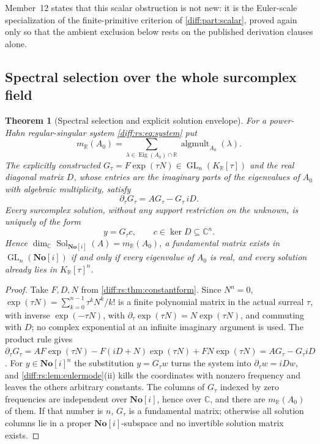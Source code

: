 \documentclass[11pt,letterpaper]{article}
\numberwithin{equation}{section}
\newtheorem{theorem}{Theorem}[section]
\theoremstyle{definition}
\theoremstyle{remark}
\newcommand{\SC}{\mathbf{No}[i]}
\newcommand{\R}{\mathbb R}
\newcommand{\C}{\mathbb C}
\newcommand{\der}{\partial}
\newcommand{\GL}{\operatorname{GL}}
\newcommand{\Ker}{\operatorname{ker}}
\newcommand{\derT}{\der_{\tau}}
\newcommand{\KR}{K_{\R}}
\newcommand{\Eig}{\operatorname{Eig}}
\newcommand{\Sol}{\operatorname{Sol}}
\begin{document}
Member~12 states that this scalar obstruction is not new: it is the
Euler-scale specialization of the finite-primitive criterion of
\cref{diff:part:scalar}, proved again only so that the ambient exclusion below
rests on the published derivation clauses alone.

\subsection{Spectral selection over the whole surcomplex field}
\label{diff:rs:sub:selection}

\begin{theorem}[Spectral selection and explicit solution envelope]
\label{diff:rs:thm:selection}
For a power-Hahn regular-singular system \cref{diff:rs:eq:system} put
\[
 m_{\R}(A_{0})=\sum_{\lambda\in\Eig(A_{0})\cap\R}\operatorname{algmult}_{A_{0}}(\lambda).
\]
The explicitly constructed $G_{\tau}=F\exp(\tau N)\in\GL_{n}(\KR[\tau])$ and
the real diagonal matrix $D$, whose entries are the imaginary parts of the
eigenvalues of $A_{0}$ with algebraic multiplicity, satisfy
\begin{equation}\label{diff:rs:eq:Gtau}
 \derT G_{\tau}=AG_{\tau}-G_{\tau}\,iD .
\end{equation}
Every surcomplex solution, without any support restriction on the unknown, is
uniquely of the form
\begin{equation}\label{diff:rs:eq:allsol}
 y=G_{\tau}c,\qquad c\in\Ker D\subseteq\C^{n}.
\end{equation}
Hence $\dim_{\C}\Sol_{\SC}(A)=m_{\R}(A_{0})$, a fundamental matrix exists in
$\GL_{n}(\SC)$ if and only if every eigenvalue of $A_{0}$ is real, and every
solution already lies in $\KR[\tau]^{n}$.
\end{theorem}
\begin{proof}
Take $F,D,N$ from \cref{diff:rs:thm:constantform}. Since $N^{n}=0$,
$\exp(\tau N)=\sum_{k=0}^{n-1}\tau^{k}N^{k}/k!$ is a finite polynomial matrix
in the actual surreal $\tau$, with inverse $\exp(-\tau N)$, with
$\derT\exp(\tau N)=N\exp(\tau N)$, and commuting with $D$; no complex exponential
at an infinite imaginary argument is used. The product rule gives
$\derT G_{\tau}=AF\exp(\tau N)-F(iD+N)\exp(\tau N)+FN\exp(\tau N)
=AG_{\tau}-G_{\tau}iD$. For $y\in\SC^{n}$ the substitution $y=G_{\tau}w$ turns
the system into $\derT w=iDw$, and \cref{diff:rs:lem:eulermode}(ii) kills the
coordinates with nonzero frequency and leaves the others arbitrary constants.
The columns of $G_{\tau}$ indexed by zero frequencies are independent over
$\SC$, hence over $\C$, and there are $m_{\R}(A_{0})$ of them. If that number is
$n$, $G_{\tau}$ is a fundamental matrix; otherwise all solution columns lie in a
proper $\SC$-subspace and no invertible solution matrix exists.
\end{proof}
\end{document}
